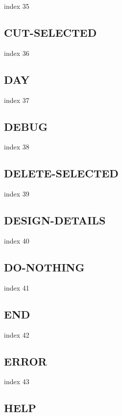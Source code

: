 \documentclass[a4paper]{report}
\begin{document}
{{{{{{{{{{{{{index 35

\subsection{CUT-SELECTED}

index 36

\subsection{DAY}

index 37

\subsection{DEBUG}

index 38

\subsection{DELETE-SELECTED}

index 39

\subsection{DESIGN-DETAILS}

index 40

\subsection{DO-NOTHING}

index 41

\subsection{END}

index 42

\subsection{ERROR}

index 43

\subsection{HELP}

}}}}}}}}}}}}}
\end{document}
